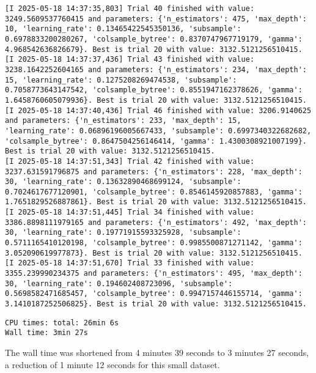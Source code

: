 \documentclass[
  letterpaper,
  DIV=11,
  numbers=noendperiod]{scrreprt}
\begin{document}
\begin{verbatim}
[I 2025-05-18 14:37:35,803] Trial 40 finished with value: 3249.5609537760415 and parameters: {'n_estimators': 475, 'max_depth': 10, 'learning_rate': 0.13465422545350136, 'subsample': 0.6978833200280267, 'colsample_bytree': 0.8370747967719179, 'gamma': 4.968542636826679}. Best is trial 20 with value: 3132.5121256510415.
[I 2025-05-18 14:37:37,436] Trial 43 finished with value: 3238.1642252604165 and parameters: {'n_estimators': 234, 'max_depth': 15, 'learning_rate': 0.1275208269474538, 'subsample': 0.7058773643147542, 'colsample_bytree': 0.8551947162378626, 'gamma': 1.6458760605079936}. Best is trial 20 with value: 3132.5121256510415.
[I 2025-05-18 14:37:40,436] Trial 46 finished with value: 3206.9140625 and parameters: {'n_estimators': 233, 'max_depth': 15, 'learning_rate': 0.06896196005667433, 'subsample': 0.6997340322682682, 'colsample_bytree': 0.8647504256146414, 'gamma': 1.4300308921007199}. Best is trial 20 with value: 3132.5121256510415.
[I 2025-05-18 14:37:51,343] Trial 42 finished with value: 3237.631591796875 and parameters: {'n_estimators': 228, 'max_depth': 30, 'learning_rate': 0.13632890468699124, 'subsample': 0.7024617677120901, 'colsample_bytree': 0.8546145920857883, 'gamma': 1.7651829526887861}. Best is trial 20 with value: 3132.5121256510415.
[I 2025-05-18 14:37:51,445] Trial 34 finished with value: 3386.8898111979165 and parameters: {'n_estimators': 492, 'max_depth': 30, 'learning_rate': 0.19771915593325928, 'subsample': 0.5711165410120198, 'colsample_bytree': 0.9985500871271142, 'gamma': 3.052090619977873}. Best is trial 20 with value: 3132.5121256510415.
[I 2025-05-18 14:37:51,670] Trial 33 finished with value: 3355.239990234375 and parameters: {'n_estimators': 495, 'max_depth': 30, 'learning_rate': 0.194602408723096, 'subsample': 0.5698582471685457, 'colsample_bytree': 0.9947157446155714, 'gamma': 3.1410187252506825}. Best is trial 20 with value: 3132.5121256510415.
\end{verbatim}

\begin{verbatim}
CPU times: total: 26min 6s
Wall time: 3min 27s
\end{verbatim}

The wall time was shortened from 4 minutes 39 seconds to 3 minutes 27
seconds, a reduction of 1 minute 12 seconds for this small dataset.
\end{document}
